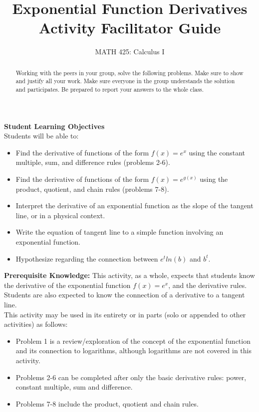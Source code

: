 \documentclass{ximera}
\title{Exponential Function Derivatives Activity Facilitator Guide}
\author{MATH 425: Calculus I}
\begin{document}
\begin{abstract}
    Working with the peers in your group, solve the following problems. Make sure to show and justify all your work. Make sure everyone in the group understands the solution and participates. Be prepared to report your answers to the whole class. 
\end{abstract}
\maketitle

\textbf{Student Learning Objectives}\\
Students will be able to:
    \begin{itemize}
        \item Find the derivative of functions of the form $f(x)=e^x$ using the constant multiple, sum, and difference rules  (problems 2-6).
        \item Find the derivative of functions of the form $f(x)=e^{g(x)}$ using the product, quotient, and chain rules (problems 7-8).
        \item Interpret the derivative of an exponential function as the slope of the tangent line, or in a physical context.
        \item Write the equation of tangent line to a simple function involving an exponential function.
        \item Hypothesize regarding the connection between $e^tln(b)$ and $b^t$.
    \end{itemize}

\textbf{Prerequisite Knowledge:} This activity, as a whole, expects that students know the derivative of the exponential function $f(x)=e^x$, and the derivative rules.  Students are also expected to know the connection of a derivative to a tangent line. \\
This activity may be used in its entirety or in parts (solo or appended to other activities) as follows: \\
\begin{itemize}
    \item Problem 1 is a review/exploration of the concept of the exponential function and its connection to logarithms, although logarithms are not covered in this activity.  
    \item Problems 2-6 can be completed after only the basic derivative rules: power, constant multiple, sum and difference. 
    \item Problems 7-8 include the product, quotient and chain rules.
\end{itemize}
\end{document}
